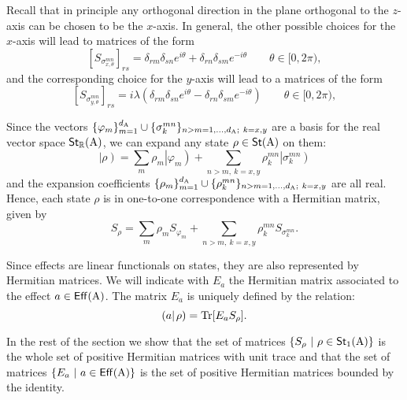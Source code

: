 \documentclass[12pt,aps,pra,showpacs,groupedaddress]{revtex4-1}
\def\Cntset{{\mathsf{Eff}}}
\def\Stset{{\mathsf{St}}}
\def\K#1{\left|#1\right)}  \def\B#1{\left(#1\right|}
\def\SC#1#2{\left(#1\right|\left.\!#2\right)}  \def\Tr{{\rm Tr}}
\def\Reals{{\mathbb R}}
\begin{document}
 
Recall that in principle any orthogonal direction in the plane orthogonal to the $z$-axis can be chosen to be
the $x$-axis.  In general, the other possible choices for the $x$-axis will lead to matrices of the form
\begin{equation}
  \left[S_{\sigma^{mn}_{x,\theta}}\right]_{rs} =  \delta_{rm} \delta_{sn}  e^{i\theta} + \delta_{rn} \delta_{sm} e^{-i\theta} \qquad \theta \in [0, 2\pi)\label{eq:rotax},
\end{equation}
and the corresponding choice for the $y$-axis will lead to a matrices of the form 
\begin{equation}
  \left[S_{\sigma^{mn}_{y,\theta}}\right]_{rs} =   i \lambda \left(  \delta_{rm} \delta_{sn}      e^{i\theta} - \delta_{rn} \delta_{sm} e^{-i\theta} \right) \qquad \theta \in [0, 2\pi)\label{eq:rotay},
\end{equation}
 

  
Since the vectors $\{\varphi_m\}_{m=1}^{d_{\rm A}} \cup \{\sigma_k^{mn}\}_{n>m=1,\dots,d_{\rm A} ;\ k=x,y}$
are a basis for the real vector space $\Stset_{\Reals} (\rA)$, we can expand any state $\rho \in
\Stset(\rA)$ on them:
\begin{equation}\label{eq:expandrho} 
  \K \rho = \sum_m \rho _m \K{\varphi_m}+\sum_{n>m,\ k=x,y} \rho_{k}^{mn} \K{\sigma_{k}^{mn}}
\end{equation}
and the expansion coefficients $\{\rho_m\}_{m=1}^{d_{\rm A} } \cup \{\rho^{mn}_{k}\}_{n>m =1, \dots,
  d_{\rm A}; \ k = x,y}$ are all real.  Hence, each state $\rho$ is in one-to-one correspondence with a
Hermitian matrix, given by
\begin{equation}\label{eq:expandsrho} 
  S_\rho = \sum_m  \rho_m S_{\varphi_m}+\sum_{n>m,\ k=x,y} \rho_{k}^{mn}  S_{\sigma_{k}^{mn}}.
\end{equation}


Since effects are linear functionals on states, they are also represented by Hermitian matrices. We
will indicate with $E_a$ the Hermitian matrix associated to the effect $a \in \Cntset (\rA)$.  The matrix $E_a$ is uniquely defined by the relation:
\begin{equation*}\SC a \rho = \Tr[E_a S_\rho]. 
\end{equation*}

In the rest of the section we show that the set of matrices $\{S_\rho ~|~ \rho \in \Stset_1 (\rA)\}$
is the whole set of positive Hermitian matrices with unit trace and that the set of matrices $\{E_a
~|~ a \in \Cntset(\rA)\}$ is the set of positive Hermitian matrices bounded by the identity.
\end{document}
